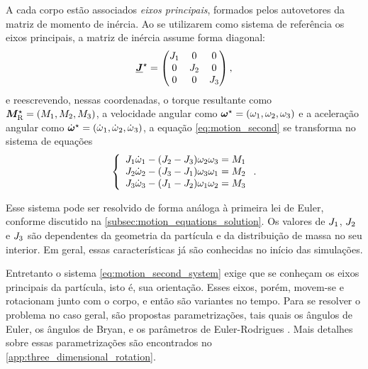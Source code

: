 A cada corpo estão associados \textit{eixos principais}, formados pelos autovetores da matriz de momento de inércia. Ao se utilizarem como sistema de referência os eixos principais, a matriz de inércia assume forma diagonal:
\begin{equation*}
	\underline{\bm{J}}^\star =
	\begin{pmatrix}
		J_1 & 0 & 0 \\
		0 & J_2 & 0 \\
		0 & 0 & J_3 \\
	\end{pmatrix},
\end{equation*}
e reescrevendo, nessas coordenadas, o torque resultante como \(\principal{\resultingTorque} = \explicitVectorPrincipalCoordinates{\torqueScalar}\), a velocidade angular como \(\principal{\angularVelocity} = \explicitVectorPrincipalCoordinates{\angularVelocityScalar}\) e a aceleração angular como \(\principal{\angularAcceleration} = \explicitVectorPrincipalCoordinates{\deriv{1}{\angularVelocityScalar}}\), a equação \eqref{eq:motion_second} se transforma no sistema de equações
\begin{equation} \label{eq:motion_second_system}
	\left\lbrace
	\begin{array}{l}
		\momentOfInertia_1\deriv{1}{\angularVelocityScalar}_1 - \pqty{\momentOfInertia_2 - \momentOfInertia_3}\angularVelocityScalar_2\angularVelocityScalar_3 = \torqueScalar_1 \\
		\momentOfInertia_2\deriv{1}{\angularVelocityScalar}_2 - \pqty{\momentOfInertia_3 - \momentOfInertia_1}\angularVelocityScalar_3\angularVelocityScalar_1 = \torqueScalar_2 \\
		\momentOfInertia_3\deriv{1}{\angularVelocityScalar}_3 - \pqty{\momentOfInertia_1 - \momentOfInertia_2}\angularVelocityScalar_1\angularVelocityScalar_2 = \torqueScalar_3
	\end{array}
	\right.
	.
\end{equation}

Esse sistema pode ser resolvido de forma análoga à primeira lei de Euler, conforme discutido na \autoref{subsec:motion_equations_solution}. Os valores de \(J_1\), \(J_2\) e \(J_3\) são dependentes da geometria da partícula e da distribuição de massa no seu interior. Em geral, essas características já são conhecidas no início das simulações.

Entretanto o sistema \eqref{eq:motion_second_system} exige que se conheçam os eixos principais da partícula, isto é, sua orientação. Esses eixos, porém, movem-se e rotacionam junto com o corpo, e então são variantes no tempo. Para se resolver o problema no caso geral, são propostas parametrizações, tais quais os ângulos de Euler, os ângulos de Bryan, e os parâmetros de Euler-Rodrigues \cite{bib:dynamics_of_multibody_systems}. Mais detalhes sobre essas parametrizações são encontrados no \autoref{app:three_dimensional_rotation}.

